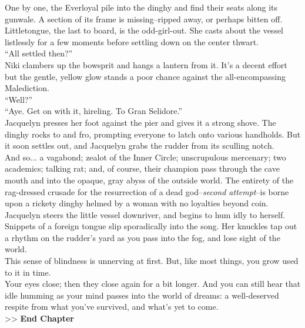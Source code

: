 One by one, the Everloyal pile into the dinghy and find their seats along its gunwale. A section of its frame is missing--ripped away, or perhaps bitten off. Littletongue, the last to board, is the odd-girl-out. She casts about the vessel listlessly for a few moments before settling down on the center thwart.\\

“All settled then?”\\

Niki clambers up the bowsprit and hangs a lantern from it. It’s a decent effort but the gentle, yellow glow stands a poor chance against the all-encompassing Malediction.\\

“Well?”\\

“Aye. Get on with it, hireling. To Gran Selidore.”\\

Jacquelyn presses her foot against the pier and gives it a strong shove. The dinghy rocks to and fro, prompting everyone to latch onto various handholds. But it soon settles out, and Jacquelyn grabs the rudder from its sculling notch.\\

And so... a vagabond; zealot of the Inner Circle; unscrupulous mercenary; two academics; talking rat; and, of course, their champion pass through the cave mouth and into the opaque, gray abyss of the outside world. The entirety of the rag-dressed crusade for the resurrection of a dead god--\emph{second attempt}--is borne upon a rickety dinghy helmed by a woman with no loyalties beyond coin.\\

Jacquelyn steers the little vessel downriver, and begins to hum idly to herself. Snippets of a foreign tongue slip sporadically into the song. Her knuckles tap out a rhythm on the rudder’s yard as you pass into the fog, and lose sight of the world.\\

This sense of blindness is unnerving at first. But, like most things, you grow used to it in time.\\

Your eyes close; then they close again for a bit longer. And you can still hear that idle humming as your mind passes into the world of dreams: a well-deserved respite from what you’ve survived, and what’s yet to come.\\

>> \textbf{End Chapter}